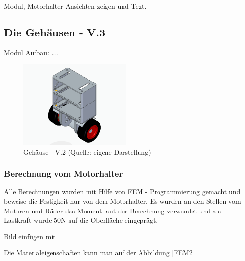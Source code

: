 Modul, Motorhalter Ansichten zeigen und Text.
\renewcommand{\autoren}{Valentyn Chepil}
\newpage

\subsection{Die Gehäusen - V.3}

Modul Aufbau: ....


\begin{figure}[!h]  %
	\centering\includegraphics[width=0.5\textwidth]{images/gehaeuse-v3.png}
	\caption{Gehäuse - V.2 \newline (Quelle: eigene Darstellung)}
	\label{gehaeuse-v3} %
\end{figure}

\subsubsection{ Berechnung vom Motorhalter}

Alle Berechnungen wurden mit Hilfe von FEM - Programmierung gemacht und beweise die Festigkeit nur von dem Motorhalter. Es wurden an den Stellen vom Motoren und Räder das Moment laut der Berechnung %
 verwendet und als Lastkraft wurde 50N auf die Oberfläche eingeprägt. 

Bild einfügen mit %

Die Materialeigenschaften kann man auf der Abbildung \ref{FEM2}

